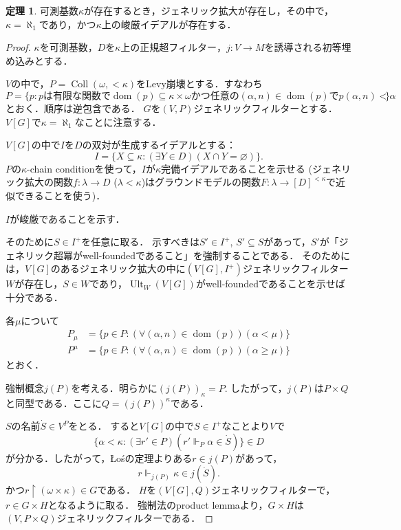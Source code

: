 \documentclass[uplatex]{jsarticle}
\newcommand{\dom}{\operatorname{dom}}
\newcommand\forces{\Vdash}
\newcommand{\restrict}{\upharpoonright}
\newcommand{\Ult}{\operatorname{Ult}}
\newcommand{\Coll}{\operatorname{Coll}}
\renewcommand\emptyset{\varnothing}
\renewcommand\subset{\subseteq}
\theoremstyle{definition}
\newtheorem{thm}{定理}[section]
\begin{document}
	\begin{thm}
		可測基数$\kappa$が存在するとき，ジェネリック拡大が存在し，その中で，$\kappa = \aleph_1$であり，かつ$\kappa$上の峻厳イデアルが存在する．
	\end{thm}
	\begin{proof}
		$\kappa$を可測基数，$D$を$\kappa$上の正規超フィルター，$j \colon V \to M$を誘導される初等埋め込みとする．
		
		$V$の中で，$P = \Coll(\omega, {<}\kappa)$をLevy崩壊とする．すなわち
		\[
		P = \{ p : \text{$p$は有限な関数で$\dom(p) \subset \kappa \times \omega$かつ任意の$(\alpha, n) \in \dom(p)$で$p(\alpha, n) < \alpha$} \}
		\]
		とおく．順序は逆包含である．
		$G$を$(V, P)$ジェネリックフィルターとする．$V[G]$で$\kappa = \aleph_1$なことに注意する．
		
		$V[G]$の中で$I$を$D$の双対が生成するイデアルとする：
		\[
		I = \{ X \subset \kappa : (\exists Y \in D)(X \cap Y = \emptyset)\}.
		\]
		$P$の$\kappa$-chain conditionを使って，$I$が$\kappa$完備イデアルであることを示せる (ジェネリック拡大の関数$f : \lambda \to D$ ($\lambda < \kappa$)はグラウンドモデルの関数$F \colon \lambda \to [D]^{<\kappa}$で近似できることを使う)．
		
		$I$が峻厳であることを示す．
		
		そのために$S \in I^+$を任意に取る．
		示すべきは$S' \in I^+$, $S' \subset S$があって，$S'$が「ジェネリック超冪がwell-foundedであること」を強制することである．
		そのためには，$V[G]$のあるジェネリック拡大の中に$(V[G], I^+)$ジェネリックフィルター$W$が存在し，$S \in W$であり，$\Ult_W(V[G])$がwell-foundedであることを示せば十分である．
		
		各$\mu$について
		\begin{align*}
		P_\mu &= \{ p \in P : (\forall (\alpha, n) \in \dom(p))(\alpha < \mu) \} \\
		P^\mu &= \{ p \in P : (\forall (\alpha, n) \in \dom(p))(\alpha \ge \mu) \}
		\end{align*}
		とおく．
		
		強制概念$j(P)$を考える．明らかに$(j(P))_\kappa = P$.
		したがって，$j(P)$は$P \times Q$と同型である．ここに$Q = (j(P))^\kappa$である．
		
		$S$の名前$\dot{S} \in V^P$をとる．
		すると$V[G]$の中で$S \in I^+$なことより$V$で
		\[
		\{ \alpha < \kappa : (\exists r' \in P)(r' \forces_P \alpha \in \dot{S}) \} \in D
		\]
		が分かる．したがって，Łośの定理よりある$r \in j(P)$があって，
		\[
		r \forces_{j(P)} \kappa \in j(\dot{S}).
		\]
		かつ$r \restrict (\omega \times \kappa) \in G$である．
		$H$を$(V[G], Q)$ジェネリックフィルターで，$r \in G\times H$となるように取る．
		強制法のproduct lemmaより，$G \times H$は$(V, P \times Q)$ジェネリックフィルターである．
		

\end{proof}
\end{document}
